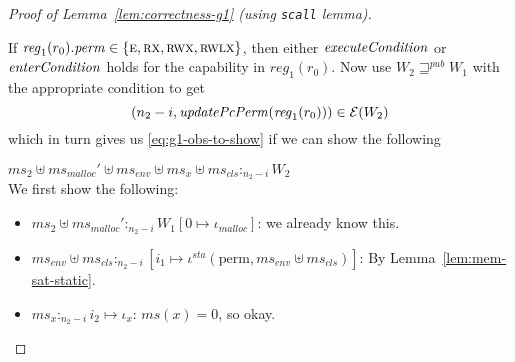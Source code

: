 \documentclass[a4paper]{article}
\newcommand{\update}[2]{[#1 \mapsto #2]}
\newcommand{\var}[1]{\mathit{#1}}
\newcommand{\hs}{\var{ms}}
\newcommand{\ms}{\hs}
\newcommand{\reg}{\var{reg}}
\newcommand{\heap}{\var{mem}}
\newcommand{\perm}{\var{perm}}
\newcommand{\sta}{\var{sta}}
\newcommand{\env}{\var{env}}
\newcommand{\cls}{\var{cls}}
\newcommand{\plainfun}[2]{
  \ifthenelse{\equal{#2}{}}
  {\mathit{#1}}
  {\mathit{#1}(#2)}
}
\newcommand{\updatePcPerm}[1]{\plainfun{updatePcPerm}{#1}}
\newcommand{\execCond}[1]{\plainfun{executeCondition}{#1}}
\newcommand{\entryCond}[1]{\plainfun{enterCondition}{#1}}
\newcommand{\futurewk}{\mathbin{\sqsupseteq}^{\var{pub}}}
\newcommand{\heapSat}[3][\heap]{#1 :_{#2} #3}
\newcommand{\memSat}[3][n]{\heapSat[#2]{#1}{#3}}
\newcommand{\codelabel}[1]{\mathit{#1}}
\newcommand{\malloc}{\codelabel{malloc}}
\newcommand{\asmType}{\plaindom{AsmType}}
\newcommand{\plaindom}[1]{\mathrm{#1}}
\newcommand{\intr}[2]{\mathcal{#1}}
\newcommand{\exprintr}[1]{\intr{E}{#1}}
\newcommand{\stder}{\exprintr{\asmType}}
\newcommand{\npair}[2][n]{\left(#1,#2 \right)}
\newcommand{\plainperm}[1]{\textsc{#1}}
\newcommand{\exec}{\plainperm{rx}}
\newcommand{\entry}{\plainperm{e}}
\newcommand{\rwx}{\plainperm{rwx}}
\newcommand{\rwlx}{\plainperm{rwlx}}
\newcommand{\plainview}[1]{\mathrm{#1}}
\newcommand{\perma}{\plainview{perm}}
\begin{document}
\begin{proof}[Proof of Lemma~\ref{lem:correctness-g1} (using \texttt{scall} lemma)]
\begin{enumproof}[resume]
\begin{enumproof}
          If $\reg_1(r_0).\perm \in \{\entry, \exec, \rwx, \rwlx\}$, then either $\execCond{}$ or $\entryCond{}$ holds for the capability in $\reg_1(r_0)$. Now use $W_2 \futurewk W_1$ with the appropriate condition to get 
          \[
            \npair[n_2-i]{\updatePcPerm{\reg_1(r_0)}} \in \stder(W_2)
          \]
          which in turn gives us \ref{eq:g1-obs-to-show} if we can show the following
          \begin{enumproof}
            \item $\memSat[n_2-i]{\ms_2 \uplus \ms_\malloc' \uplus \ms_\env \uplus \ms_x \uplus \ms_\cls}{W_2}$\\
              We first show the following:
              \begin{itemize}
              \item $\memSat[n_2-i]{\ms_2 \uplus \ms_\malloc'}{W_1\update{0}{\iota_\malloc}}$: we already know this.
              \item $\memSat[n_2-i]{\ms_\env \uplus \ms_\cls}{[i_1 \mapsto \iota^\sta(\perma, \ms_\env \uplus \ms_\cls)]}$: By Lemma~\ref{lem:mem-sat-static}.
              \item $\memSat[n_2-i]{\ms_x}{i_2 \mapsto \iota_x}$: $\ms(x) = 0$, so okay.
              \end{itemize}


\end{enumproof}
\end{enumproof}
\end{enumproof}
\end{proof}
\end{document}
